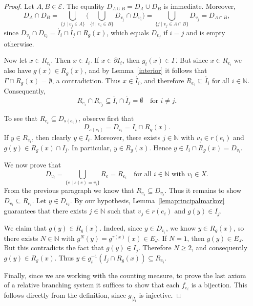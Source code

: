 \documentclass[12pt, reqno]{amsart}
\theoremstyle{definition}
\theoremstyle{remark}
\numberwithin{equation}{section}
\begin{document}
\begin{proof}
Let $A,B \in \mathcal{E}$. 
The equality $D_{A \cup B} = D_{A} \cup D_{B}$ is immediate. 
Moreover,
\[
D_{A} \cap D_{B} 
   = \bigcup_{\{j \mid v_j \in A\}}
       \Big( \bigcup_{\{i \mid v_i \in B\}} D_{v_j} \cap D_{v_i} \Big) 
   = \bigcup_{\{j \mid v_j \in A \cap B\}} D_{v_j} 
   = D_{A \cap B},
\]
since $D_{v_j} \cap D_{v_i} 
   = \mathring{I_i} \cap \mathring{I_j} \cap R_g(x)$, 
which equals $D_{v_j}$ if $i=j$ and is empty otherwise.  

Now let $x \in R_{e_i}$.  
Then $x \in I_i$. 
If $x \in \partial I_i$, then $g_i(x) \in \Gamma$.  
But since $x \in R_{e_i}$ we also have $g(x) \in R_g(x)$, 
and by Lemma~\ref{interior} it follows that $\Gamma \cap R_g(x) = \emptyset$, 
a contradiction.  
Thus $x \in \mathring{I_i}$, and therefore $R_{e_i} \subseteq \mathring{I_i}$ for all $i \in \mathbb{N}$. 
Consequently,
\[
R_{e_i} \cap R_{e_j} \subseteq \mathring{I_i} \cap \mathring{I_j} = \emptyset
\quad \text{for } i \neq j.
\]

To see that $R_{e_i} \subseteq D_{s(e_i)}$, observe first that 
\[
D_{s(e_i)} = D_{v_i} = I_i \cap R_g(x).
\] 
If $y \in R_{e_i}$, then clearly $y \in I_i$. 
Moreover, there exists $j \in \mathbb{N}$ with $v_j \in r(e_i)$ and 
$g(y) \in R_g(x) \cap I_j$. 
In particular, $y \in R_g(x)$. 
Hence $y \in I_i \cap R_g(x) = D_{v_i}$.  

We now prove that 
\[
D_{v_i} = \bigcup_{\{e \mid s(e) = v_i\}} R_e = R_{e_i}
\quad \text{for all } i \in \mathbb{N} \text{ with } v_i \in X.
\]
From the previous paragraph we know that $R_{e_i} \subseteq D_{v_i}$.  
Thus it remains to show $D_{v_i} \subseteq R_{e_i}$.  
Let $y \in D_{v_i}$.  
By our hypothesis, Lemma~\ref{lemaprincipalmarkov} guarantees that there exists 
$j \in \mathbb{N}$ such that $v_j \in r(e_i)$ and $g(y) \in I_j$.  

We claim that $g(y) \in R_g(x)$.  
Indeed, since $y \in D_{v_i}$, we know $y \in R_g(x)$, so there exists $N \in \mathbb{N}$ with
$
g^N(y) = g^{\tau(x)}(x) \in E_J.
$
If $N=1$, then $g(y) \in E_J$.  
But this contradicts the fact that $g(y) \in I_j$.  
Therefore $N \geq 2$, and consequently $g(y) \in R_g(x)$.  
Thus $
y \in g_i^{-1}(I_j \cap R_g(x)) \subseteq R_{e_i}$.


Finally, since we are working with the counting measure, to prove the last axiom 
of a relative branching system it suffices to show that each $f_{e_i}$ is a bijection.  
This follows directly from the definition, since $g_{|\mathring{I_i}}$ is injective.  
\end{proof}
\end{document}
